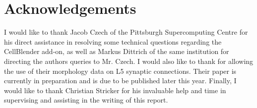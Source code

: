 \documentclass[a4paper]{article}
\begin{document}
\section{Acknowledgements}
I would like to thank Jacob Czech of the Pittsburgh Supercomputing Centre for his direct assistance in resolving some technical questions regarding the CellBlender add-on, as well as Markus Dittrich of the same institution for directing the authors queries to Mr. Czech. I would also like to thank \cite{Rollehagen::2015} for allowing the use of their morphology data on L5 synaptic connections. Their paper is currently in preparation and is due to be published later this year. Finally, I would like to thank Christian Stricker for his invaluable help and time in supervising and assisting in the writing of this report.

{}

\end{document}

